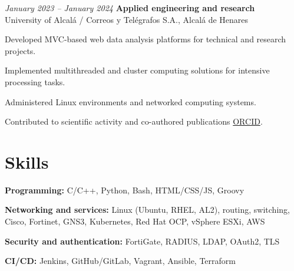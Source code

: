 \vspace{0.2 cm}

\begin{twocolentry}{\textit{January 2023 – January 2024}}
	\textbf{Applied engineering and research} \\
	University of Alcalá / Correos y Telégrafos S.A., Alcalá de Henares
\end{twocolentry}
\begin{onecolentry}
	\begin{highlights}
		\item Developed MVC-based web data analysis platforms for technical and research projects.
		\item Implemented multithreaded and cluster computing solutions for intensive processing tasks.
		\item Administered Linux environments and networked computing systems.
		\item Contributed to scientific activity and co-authored publications \href{https://orcid.org/0009-0000-6862-1872}{ORCID}.
	\end{highlights}
\end{onecolentry}

\vspace{-7pt}

\section{Skills}

\begin{onecolentry}
	\textbf{Programming:} C/C++, Python, Bash, HTML/CSS/JS, Groovy
\end{onecolentry}
\begin{onecolentry}
	\textbf{Networking and services:} Linux (Ubuntu, RHEL, AL2), routing, switching, Cisco, Fortinet, GNS3, Kubernetes, Red Hat OCP, vSphere ESXi, AWS
\end{onecolentry}
\begin{onecolentry}
	\textbf{Security and authentication:} FortiGate, RADIUS, LDAP, OAuth2, TLS
\end{onecolentry}
\begin{onecolentry}
	\textbf{CI/CD:} Jenkins, GitHub/GitLab, Vagrant, Ansible, Terraform
\end{onecolentry}